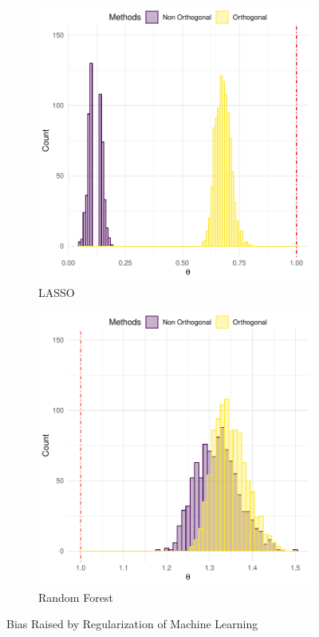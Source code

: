 \documentclass[en,mtpro2]{elegantpaper}
\begin{document}
\begin{figure}[htpb]
    \centering
    \begin{subfigure}{.45\textwidth}
        \centering
        \includegraphics[width=\linewidth]{figures/non-orthogonal-vs-orthogonal-lasso.pdf}
        \caption{LASSO}
    \end{subfigure}
    \begin{subfigure}{.45\textwidth}
        \centering
        \includegraphics[width=\linewidth]{figures/non-orthogonal-vs-orthogonal-rf.pdf}
        \caption{Random Forest}
    \end{subfigure}
    \caption{Bias Raised by Regularization of Machine Learning}
\end{figure}
\end{document}
